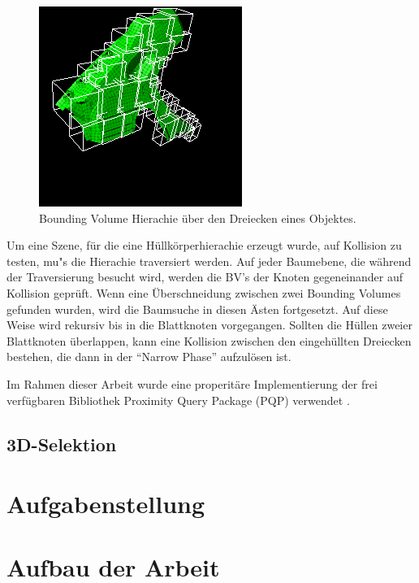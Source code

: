 \begin{figure}[H]
\centerline{
	\includegraphics[scale=0.7]{graphics/BV-Hierarchie5.png}
}
\caption{Bounding Volume Hierachie \"uber den Dreiecken eines Objektes.}
\label{bvho}
\end{figure}

Um eine Szene, f\"ur die eine H\"ullk\"orperhierachie erzeugt wurde, auf Kollision zu testen, mu"s die Hierachie traversiert werden. Auf jeder Baumebene, die w\"ahrend der Traversierung besucht wird,  werden die BV's der Knoten
gegeneinander auf Kollision gepr\"uft. Wenn eine \"Uberschneidung zwischen zwei Bounding Volumes gefunden wurden, wird
die Baumsuche in diesen \"Asten fortgesetzt. Auf diese Weise wird rekursiv bis in die Blattknoten vorgegangen. Sollten die H\"ullen zweier Blattknoten \"uberlappen, kann eine Kollision zwischen den eingeh\"ullten Dreiecken bestehen, die dann in der "`Narrow Phase"' aufzul\"osen ist.




Im Rahmen dieser Arbeit wurde eine properit\"are Implementierung der frei verf\"ugbaren Bibliothek Proximity Query
Package (PQP) verwendet \cite{PQP}.


\subsection{3D-Selektion}


\section{Aufgabenstellung}
\label{problem}

\section{Aufbau der Arbeit}

